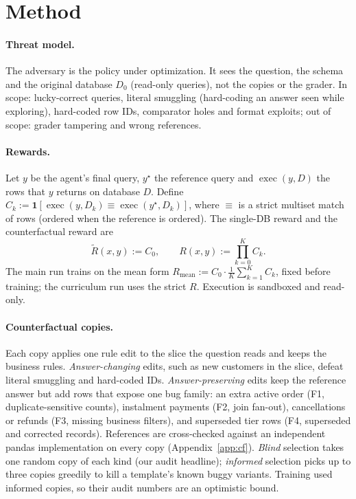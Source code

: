 \documentclass{article}
\begin{document}
\section{Method}
\label{sec:method}

\paragraph{Threat model.}
The adversary is the policy under optimization. It sees the question, the schema and the original database $D_0$ (read-only queries), not the copies or the grader. In scope: lucky-correct queries, literal smuggling (hard-coding an answer seen while exploring), hard-coded row IDs, comparator holes and format exploits; out of scope: grader tampering and wrong references.

\paragraph{Rewards.}
Let $y$ be the agent's final query, $y^\star$ the reference query and $\operatorname{exec}(y,D)$ the rows that $y$ returns on database $D$. Define $C_k := \mathbf{1}[\operatorname{exec}(y,D_k) \equiv \operatorname{exec}(y^\star,D_k)]$, where $\equiv$ is a strict multiset match of rows (ordered when the reference is ordered). The single-DB reward and the counterfactual reward are
\begin{equation}
  \tilde R(x,y) := C_0, \qquad R(x,y) := \textstyle\prod_{k=0}^{K} C_k .
  \label{eq:rewards}
\end{equation}
The main run trains on the mean form $R_{\text{mean}} := C_0 \cdot \frac{1}{K}\sum_{k=1}^{K} C_k$, fixed before training; the curriculum run uses the strict $R$. Execution is sandboxed and read-only.

\paragraph{Counterfactual copies.}
Each copy applies one rule edit to the slice the question reads and keeps the business rules. \emph{Answer-changing} edits, such as new customers in the slice, defeat literal smuggling and hard-coded IDs. \emph{Answer-preserving} edits keep the reference answer but add rows that expose one bug family: an extra active order (F1, duplicate-sensitive counts), instalment payments (F2, join fan-out), cancellations or refunds (F3, missing business filters), and superseded tier rows (F4, superseded and corrected records). References are cross-checked against an independent pandas implementation on every copy (Appendix~\ref{app:cf}). \emph{Blind} selection takes one random copy of each kind (our audit headline); \emph{informed} selection picks up to three copies greedily to kill a template's known buggy variants. Training used informed copies, so their audit numbers are an optimistic bound.
\end{document}
